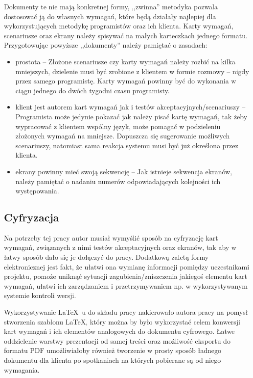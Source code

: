 Dokumenty te nie mają konkretnej formy, ,,zwinna'' metodyka pozwala dostosować ją do własnych wymagań, które będą działały najlepiej dla wykorzystujących metodykę programistów oraz ich klienta. Karty wymagań, scenariusze oraz ekrany należy spisywać na małych karteczkach jednego formatu. Przygotowując powyższe ,,dokumenty'' należy pamiętać o zasadach:
\begin{itemize}
    \item prostota -- Złożone scenariusze czy karty wymagań należy rozbić na kilka mniejszych, dzielenie musi być zrobione z klientem w formie rozmowy -- nigdy przez samego programistę. Karty wymagań powinny być do wykonania w ciągu jednego do dwóch tygodni czasu programisty.
    \item klient jest autorem kart wymagań jak i testów akceptacyjnych/scenariuszy -- Programista może jedynie pokazać jak należy pisać kartę wymagań, tak żeby wypracować z klientem wspólny język, może pomagać w podzieleniu złożonych wymagań na mniejsze. Dopuszcza się sugerowanie możliwych scenariuszy, natomiast sama reakcja systemu musi być już określona przez klienta.
    \item ekrany powinny mieć swoją sekwencję -- Jak istnieje sekwencja ekranów, należy pamiętać o nadaniu numerów odpowiadających kolejności ich występowania.
\end{itemize}

\subsection{Cyfryzacja}
\label{sec:ZSWcyfryzacja}

Na potrzeby tej pracy autor musiał wymyślić sposób na cyfryzację kart wymagań, związanych z nimi testów akceptacyjnych oraz ekranów, tak aby w łatwy sposób dało się je dołączyć do pracy. Dodatkową zaletą formy elektronicznej jest fakt, że ułatwi ona wymianę informacji pomiędzy uczestnikami projektu, pomoże uniknąć sytuacji zagubienia/zniszczenia jakiegoś elementu kart wymagań, ułatwi ich zarządzaniem i przetrzymywaniem np. w wykorzystywanym systemie kontroli wersji.

Wykorzystywanie \LaTeX~u do składu pracy nakierowało autora pracy na pomysł stworzenia szablonu \LaTeX, który można by było wykorzystać celem konwersji kart wymagań i ich elementów analogowych do dokumentu cyfrowego. Łatwe oddzielenie warstwy prezentacji od samej treści oraz możliwość eksportu do formatu PDF umożliwiałoby również tworzenie w prosty sposób ładnego dokumentu dla klienta po spotkaniach na których pobierane są od niego wymagania.

\newpage

